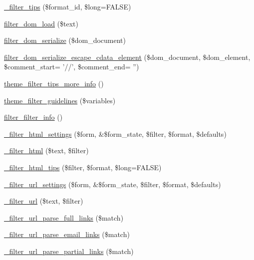 \begin{DoxyCompactItemize}
\item 
\hyperlink{filter_8module_a3b16812bade6a3a5fa942913150249b9}{\_\-filter\_\-tips} (\$format\_\-id, \$long=FALSE)
\item 
\hyperlink{filter_8module_aa7768070b172f41df24931d02c1217fe}{filter\_\-dom\_\-load} (\$text)
\item 
\hyperlink{filter_8module_a4502a9064a1eb7680ff5371b05342ec8}{filter\_\-dom\_\-serialize} (\$dom\_\-document)
\item 
\hyperlink{filter_8module_ad379f826b57d932f08d696282728217c}{filter\_\-dom\_\-serialize\_\-escape\_\-cdata\_\-element} (\$dom\_\-document, \$dom\_\-element, \$comment\_\-start= '//', \$comment\_\-end= '')
\item 
\hyperlink{group__themeable_ga433eeac690ffb684b845d10b301fdbca}{theme\_\-filter\_\-tips\_\-more\_\-info} ()
\item 
\hyperlink{group__themeable_ga1c1be7f8ecbe9bff3d03674a3c4e50ed}{theme\_\-filter\_\-guidelines} (\$variables)
\item 
\hyperlink{group__standard__filters_ga38089b90576e648c56228ee99c9c1767}{filter\_\-filter\_\-info} ()
\item 
\hyperlink{group__standard__filters_ga5e2c3faf03f281dc4ad7a4da6591fc3b}{\_\-filter\_\-html\_\-settings} (\$form, \&\$form\_\-state, \$filter, \$format, \$defaults)
\item 
\hyperlink{group__standard__filters_gaf366f72c1453f7295de4049269067a40}{\_\-filter\_\-html} (\$text, \$filter)
\item 
\hyperlink{group__standard__filters_gae86fb7b9514b6c41202c2e2479074b3b}{\_\-filter\_\-html\_\-tips} (\$filter, \$format, \$long=FALSE)
\item 
\hyperlink{group__standard__filters_ga6e9a9c137838e2ab2b0f6f2623bed95f}{\_\-filter\_\-url\_\-settings} (\$form, \&\$form\_\-state, \$filter, \$format, \$defaults)
\item 
\hyperlink{group__standard__filters_ga3014977a8aa365044b11f94abf04f313}{\_\-filter\_\-url} (\$text, \$filter)
\item 
\hyperlink{group__standard__filters_ga68b2f3e518a53457b06137c5a7525f3c}{\_\-filter\_\-url\_\-parse\_\-full\_\-links} (\$match)
\item 
\hyperlink{group__standard__filters_gae2d1ce14d2a727aba3aa5637513ec7d0}{\_\-filter\_\-url\_\-parse\_\-email\_\-links} (\$match)
\item 
\hyperlink{group__standard__filters_ga37765388ac6d3986ed00dcbfc41d330f}{\_\-filter\_\-url\_\-parse\_\-partial\_\-links} (\$match)

\end{DoxyCompactItemize}
